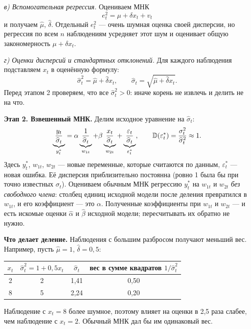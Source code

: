 \begin{solution}
\smallskip
\emph{в) Вспомогательная регрессия.} Оцениваем МНК
\[
  e_t^2 = \mu + \delta x_t + v_t
\]
и получаем $\widehat\mu$, $\widehat\delta$. Отдельный $e_t^2$ — очень шумная
оценка своей дисперсии, но регрессия по всем $n$ наблюдениям усредняет этот
шум и оценивает общую закономерность $\mu + \delta x_t$.

\smallskip
\emph{г) Оценки дисперсий и стандартных отклонений.} Для каждого наблюдения
подставляем $x_t$ в оценённую формулу:
\[
  \widehat\sigma_t^2 = \widehat\mu + \widehat\delta x_t ,
  \qquad
  \widehat\sigma_t = \sqrt{\widehat\mu + \widehat\delta x_t} .
\]
Перед этапом 2 проверяем, что все $\widehat\sigma_t^2 > 0$: иначе корень
не извлечь и делить не на что.

\medskip
\textbf{Этап 2. Взвешенный МНК.} Делим исходное уравнение на
$\widehat\sigma_t$:
\[
  \underbrace{\frac{y_t}{\widehat\sigma_t}}_{y_t^*}
  = \alpha\underbrace{\frac{1}{\widehat\sigma_t}}_{w_{1t}}
  + \beta\underbrace{\frac{x_t}{\widehat\sigma_t}}_{w_{2t}}
  + \underbrace{\frac{\varepsilon_t}{\widehat\sigma_t}}_{\varepsilon_t^*} ,
  \qquad
  \mathbb{D}(\varepsilon_t^*) = \frac{\sigma_t^2}{\widehat\sigma_t^2} \approx 1 .
\]
Здесь $y_t^*$, $w_{1t}$, $w_{2t}$ — новые переменные, которые считаются по
данным, $\varepsilon_t^*$ — новая ошибка. Её дисперсия приблизительно
постоянна (ровно 1 была бы при точно известных $\sigma_t$). Оцениваем обычным
МНК регрессию $y_t^*$ на $w_{1t}$ и $w_{2t}$ \emph{без свободного члена}:
столбец единиц исходной модели после деления превратился в $w_{1t}$, и его
коэффициент — это $\alpha$. Полученные коэффициенты при $w_{1t}$ и $w_{2t}$ —
и есть искомые оценки $\widehat\alpha$ и $\widehat\beta$ исходной модели;
пересчитывать их обратно не нужно.

\medskip
\textbf{Что делает деление.} Наблюдения с большим разбросом получают меньший
вес. Например, пусть $\widehat\mu = 1$, $\widehat\delta = 0{,}5$:
\begin{center}
\begin{tabular}{cccc}
\toprule
$x_t$ & $\widehat\sigma_t^2 = 1 + 0{,}5x_t$ & $\widehat\sigma_t$ & вес в сумме квадратов $1/\widehat\sigma_t^2$ \\
\midrule
2 & 2 & 1,41 & 0,50 \\
8 & 5 & 2,24 & 0,20 \\
\bottomrule
\end{tabular}
\end{center}
Наблюдение с $x_t = 8$ более шумное, поэтому влияет на оценки в 2,5 раза
слабее, чем наблюдение с $x_t = 2$. Обычный МНК дал бы им одинаковый вес.


\end{solution}
